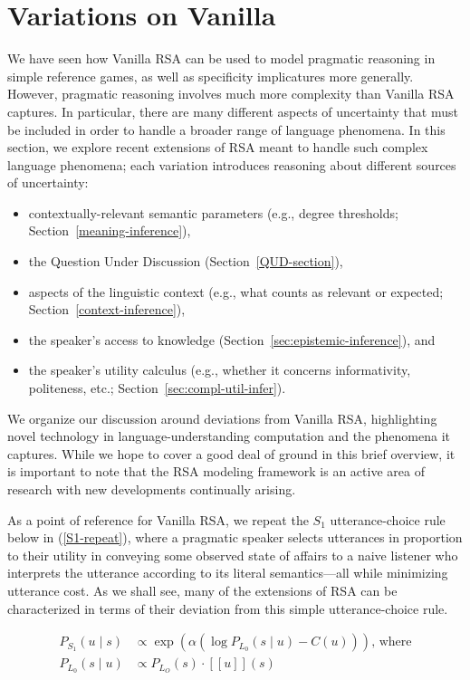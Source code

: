 \documentclass{sp}
\newcommand{\sem}[1]{\ensuremath{[\![#1]\!]}}
\begin{document}
\section{Variations on Vanilla} \label{variations}

We have seen how Vanilla RSA can be used to model pragmatic reasoning in simple reference games, as well as specificity implicatures more generally. However, pragmatic reasoning involves much more complexity than Vanilla RSA captures. In particular, there are many different aspects of uncertainty that must be included in order to handle a broader range of language phenomena. In this section, we explore recent extensions of RSA meant to handle such complex language phenomena; each variation introduces reasoning about different sources of uncertainty:
\begin{itemize}
  \item contextually-relevant semantic parameters (e.g., degree thresholds; Section~\ref{meaning-inference}),
  \item the Question Under Discussion (Section~\ref{QUD-section}),
  \item aspects of the linguistic context (e.g., what counts as relevant or expected; Section~\ref{context-inference}),
  \item the speaker's access to knowledge (Section~\ref{sec:epistemic-inference}), and
  \item the speaker's utility calculus (e.g., whether it concerns informativity, politeness, etc.; Section~\ref{sec:compl-util-infer}).
\end{itemize}
We organize our discussion around deviations from Vanilla RSA, highlighting novel technology in language-understanding computation and the phenomena it captures. While we hope to cover a good deal of ground in this brief overview, it is important to note that the RSA modeling framework is an active area of research with new developments continually arising.

As a point of reference for Vanilla RSA, we repeat the $S_1$ utterance-choice rule below in (\ref{S1-repeat}), where a pragmatic speaker selects utterances in proportion to their utility in conveying some observed state of affairs to a naive listener who interprets the utterance according to its literal semantics---all while minimizing utterance cost. As we shall see, many of the extensions of RSA can be characterized in terms of their deviation from this simple utterance-choice rule.

\begin{align} \label{S1-repeat}
  P_{S_1}(u\mid s) & \propto \exp (\alpha (\log P_{L_0}(s \mid u) - C(u))) \text{, where} \\
  P_{L_0}(s \mid u) & \propto P_{L_O}(s)  \cdot \sem{u}(s) \nonumber
\end{align}
\end{document}

